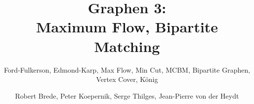 \documentclass[18pt, hideallsubsections]{beamer}
\title[Graphen III]{Graphen 3:\\ Maximum Flow, Bipartite Matching}
\subtitle{Ford-Fulkerson, Edmond-Karp, Max Flow, Min Cut, MCBM, Bipartite Graphen, Vertex Cover, König}
\author{Robert Brede, Peter Koepernik, Serge Thilges, Jean-Pierre von der Heydt}
\institute{Basispraktikum zum ICPC Programmierwettbewerb}
\begin{document}

\begin{frame}
\titlepage
\end{frame}







\appendix


\end{document}

